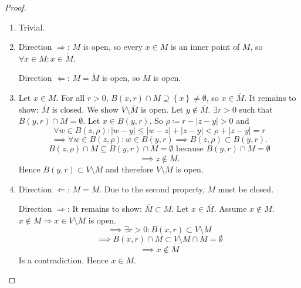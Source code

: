 \documentclass[a4paper,landscape,twocolumn]{article}
\theoremstyle{definition}
\newcommand\set[1]{\left\{#1\right\}}
\newcommand\abs[1]{\left|#1\right|}
\begin{document}
\begin{proof}
  \begin{enumerate}
    \item Trivial.
    \item Direction $\Rightarrow$: $M$ is open, so every $x \in M$ is an inner point of $M$, so $\forall x \in M: x \in \mathring{M}$.

      Direction $\Leftarrow$: $M = \mathring{M}$ is open, so $M$ is open.
    \item Let $x \in M$. For all $r > 0$, $B(x, r) \cap M \supseteq \set{x} \neq \emptyset$, so $x \in \overline{M}$.
      It remains to show: $\overline{M}$ is closed. We show $V \setminus \overline{M}$ is open. Let $y \not\in \overline{M}$. $\exists r > 0$ such that $B(y, r) \cap M = \emptyset$. Let $x \in B(y, r)$. So $\rho \coloneqq r - \abs{z - y} > 0$ and
      \[ \forall w \in B(z, \rho): \abs{w - y} \leq \abs{w - z} + \abs{z - y} < \rho + \abs{z - y} = r \]
      \[ \implies \forall w \in B(z, \rho): w \in B(y, r) \implies B(z, \rho) \subset B(y, r). \]
      \[ B(z, \rho) \cap M \subseteq B(y, r) \cap M = \emptyset \text{ because } B(y,r) \cap M = \emptyset \]
      \[ \implies z \not\in \overline{M}. \]
      Hence $B(y, r) \subset V \setminus \overline{M}$ and therefore $V \setminus \overline{M}$ is open.
    \item Direction $\Leftarrow$: $M = \overline{M}$. Due to the second property, $M$ must be closed.

      Direction $\Rightarrow$: It remains to show: $\overline{M} \subset M$. Let $x \in \overline{M}$.
      Assume $x \not\in M$. $x \not\in M \Rightarrow x \in V \setminus M$ is open.
      \[ \implies \exists r > 0: B(x, r) \subset V \setminus M \]
      \[ \implies B(x, r) \cap M \subset V \setminus M \cap M = \emptyset \]
      \[ \implies x \not\in \overline{M} \]
      Is a contradiction. Hence $x \in M$.
  \end{enumerate}
\end{proof}
\end{document}
